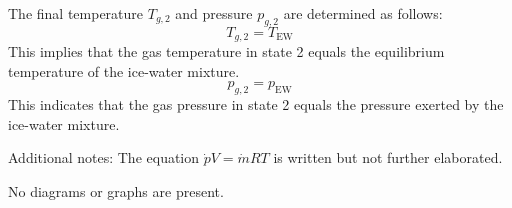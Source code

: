 The final temperature \( T_{g,2} \) and pressure \( p_{g,2} \) are determined as follows:  
\[
T_{g,2} = T_{\text{EW}}
\]  
This implies that the gas temperature in state 2 equals the equilibrium temperature of the ice-water mixture.  
\[
p_{g,2} = p_{\text{EW}}
\]  
This indicates that the gas pressure in state 2 equals the pressure exerted by the ice-water mixture.  

Additional notes:  
The equation \( \dot{p} V = \dot{m} R T \) is written but not further elaborated.  

No diagrams or graphs are present.